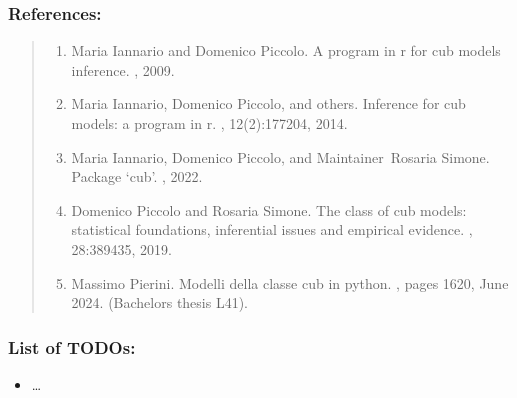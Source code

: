 \documentclass[letterpaper,10pt,english]{sphinxmanual}
\begin{document}
\subsubsection{References:}
\label{\detokenize{cubmods:id464}}\begin{quote}
\begin{enumerate}
%
\setcounter{enumi}{0}
\item {} 
\sphinxAtStartPar
Maria Iannario and Domenico Piccolo. A program in r for cub models inference. , 2009.

\item {} 
\sphinxAtStartPar
Maria Iannario, Domenico Piccolo, and others. Inference for cub models: a program in r. , 12(2):177\textendash{}204, 2014.

\item {} 
\sphinxAtStartPar
Maria Iannario, Domenico Piccolo, and Maintainer Rosaria Simone. Package ‘cub’. , 2022.

\item {} 
\sphinxAtStartPar
Domenico Piccolo and Rosaria Simone. The class of cub models: statistical foundations, inferential issues and empirical evidence. , 28:389\textendash{}435, 2019.

\item {} 
\sphinxAtStartPar
Massimo Pierini. Modelli della classe cub in python. , pages 16\textendash{}20, June 2024. (Bachelor\textquotesingle{}s thesis L\sphinxhyphen{}41).

\end{enumerate}
\end{quote}


\subsubsection{List of TODOs:}
\label{\detokenize{cubmods:id502}}\begin{itemize}
\item {} 
\sphinxAtStartPar
…

\end{itemize}
\end{document}
